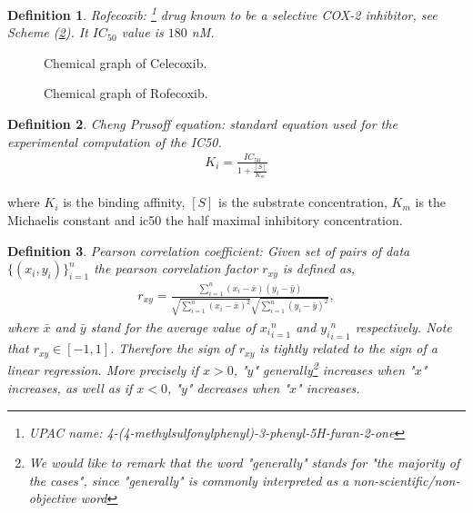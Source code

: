 \documentclass[11pt]{article}
\newtheorem{definition}{Definition}
\begin{document}
\begin{definition}\label{definitionRofecoxib}
Rofecoxib: \footnote{UPAC name: 4-(4-methylsulfonylphenyl)-3-phenyl-5H-furan-2-one} drug known to be a selective COX-2 inhibitor, see Scheme (\ref{RofecoxibFigure}). It $IC_{50}$ value is $180$ nM.
\end{definition}

\begin{figure}[H]
\captionsetup{type=scheme}
\centering
{}
\caption{Chemical graph of Celecoxib.}
\label{CelecoxibFigure}
\end{figure}

\begin{figure}[H]
\captionsetup{type=scheme}
\centering
{}
\caption{Chemical graph of Rofecoxib.}
\label{RofecoxibFigure}
\end{figure}
\begin{definition}\label{definitionChengPrusoff}
Cheng Prusoff equation: standard equation used for the experimental computation of the IC50.
	\begin{align*}
		K_i=\frac{IC_{50}}{1+\frac{[S]}{K_m}}
	\end{align*}
\end{definition}
where $K_i$ is the binding affinity, $[S]$ is the substrate concentration, $K_m$ is the Michaelis constant and \gls{ic50} the half maximal inhibitory concentration.

\begin{definition}\label{definitionPersonCoefficient}
Pearson correlation coefficient: Given set of pairs of data $\{(x_i,y_i)\}_{i=1}^n$ the pearson correlation factor $r_{xy}$ is defined as,
\begin{align}
r_{xy}=\frac{\sum_{i=1}^n(x_i-\bar{x})(y_i-\bar{y})}{\sqrt{\sum_{i=1}^n(x_i-\bar{x})^2}\sqrt{\sum_{i=1}^n(y_i-\bar{y})^2}},
\end{align}
where $\bar{x}$ and $\bar{y}$ stand for the average value of ${x_i}_{i=1}^n$ and ${y_i}_{i=1}^n$ respectively. Note that $r_{xy}\in[-1,1]$. Therefore the sign of $r_{xy}$ is tightly related to the sign of a linear regression. More precisely if $x>0$, "$y$" generally\footnote{We would like to remark that the word "generally" stands for "the majority of the cases", since "generally" is commonly interpreted as a non-scientific/non-objective word} increases when "$x$" increases, as well as if $x<0$, "$y$" decreases when "$x$" increases.
\end{definition}
\end{document}
